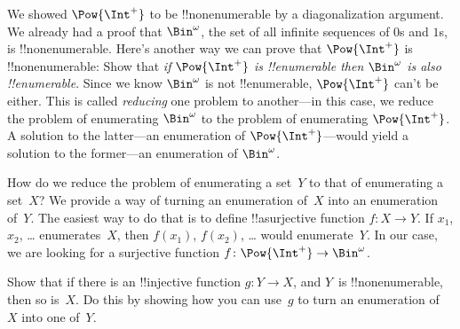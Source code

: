 \documentclass[../../../include/open-logic-section]{subfiles}
\begin{document}


We showed $\Pow{\Int^+}$ to be !!{nonenumerable} by a diagonalization
argument. We already had a proof that $\Bin^\omega$, the set of all
infinite sequences of $0$s and $1$s, is !!{nonenumerable}.  Here's
another way we can prove that $\Pow{\Int^+}$ is !!{nonenumerable}:
Show that \emph{if $\Pow{\Int^+}$ is !!{enumerable} then $\Bin^\omega$
  is also !!{enumerable}}.  Since we know $\Bin^\omega$ is not
!!{enumerable}, $\Pow{\Int^+}$ can't be either.  This is called
\emph{reducing} one problem to another---in this case, we reduce the
problem of enumerating $\Bin^\omega$ to the problem of enumerating
$\Pow{\Int^+}$.  A solution to the latter---an enumeration of
$\Pow{\Int^+}$---would yield a solution to the former---an enumeration
of $\Bin^\omega$.

How do we reduce the problem of enumerating a set~$Y$ to that of
enumerating a set~$X$?  We provide a way of turning an enumeration
of~$X$ into an enumeration of~$Y$.  The easiest way to do that is to
define !!a{surjective} function $f\colon X \to Y$.  If $x_1$, $x_2$,
\dots{} enumerates~$X$, then $f(x_1)$, $f(x_2)$, \dots{} would
enumerate~$Y$.  In our case, we are looking for a surjective
function $f\colon \Pow{\Int^+} \to \Bin^\omega$.

\begin{prob}
Show that if there is an !!{injective} function $g\colon Y \to X$, and
$Y$~is !!{nonenumerable}, then so is~$X$. Do this by showing how you
can use~$g$ to turn an enumeration of~$X$ into one of~$Y$.
\end{prob}
\end{document}
